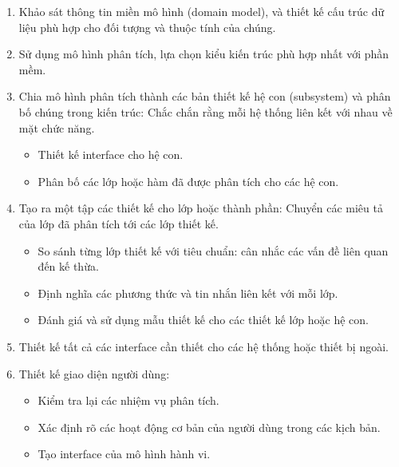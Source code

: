 \documentclass[./../SoftwareEngineering.tex]{subfiles}
\begin{document}
	\begin{multicols}{2}
		\begin{enumerate}
			\setlength\itemsep{0em}
			\item Khảo sát thông tin miền mô hình (domain model), và thiết kế cấu trúc dữ liệu phù hợp cho đối tượng và thuộc tính của chúng. 
			
			\item Sử dụng mô hình phân tích, lựa chọn kiểu kiến trúc phù hợp nhất với phần mềm.
			
			\item Chia mô hình phân tích thành các bản thiết kế hệ con (subsystem) và phân bố chúng trong kiến trúc: Chắc chắn rằng mỗi hệ thống liên kết với nhau về mặt chức năng.
			\begin{itemize}
				\setlength\itemsep{0em}
				\item Thiết kế interface cho hệ con.
				\item Phân bố các lớp hoặc hàm đã được phân tích cho các hệ con.
			\end{itemize}
			
			\item Tạo ra một tập các thiết kế cho lớp hoặc thành phần: Chuyển các miêu tả của lớp đã phân tích tới các lớp thiết kế.
			\begin{itemize}
				\setlength\itemsep{0em}
				\item So sánh từng lớp thiết kế với tiêu chuẩn: cân nhắc các vấn đề liên quan đến  kế thừa.
				
				\item Định nghĩa các phương thức và tin nhắn liên kết với mỗi lớp.
				\item Đánh giá và sử dụng mẫu thiết kế cho các thiết kế lớp hoặc hệ con.	
			\end{itemize}
			
			\item Thiết kế tất cả các interface cần thiết cho các hệ thống hoặc thiết bị ngoài.
			
			\item Thiết kế giao diện người dùng:
			\begin{itemize}
				\setlength\itemsep{0em}
				\item Kiểm tra lại các nhiệm vụ phân tích.
				
				\item Xác định rõ các hoạt động cơ bản của người dùng trong các kịch bản.
				
				\item Tạo interface của mô hình hành vi.
				

\end{itemize}
\end{enumerate}
\end{multicols}
\end{document}
